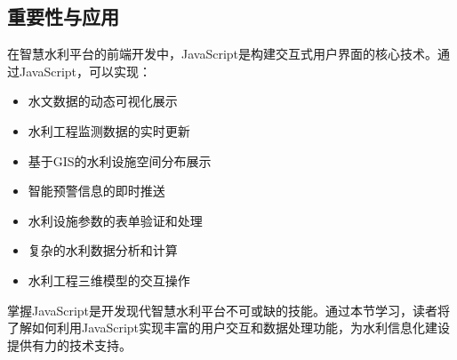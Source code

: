 \subsection{重要性与应用}\label{ux91cdux8981ux6027ux4e0eux5e94ux7528}

在智慧水利平台的前端开发中，JavaScript是构建交互式用户界面的核心技术。通过JavaScript，可以实现：

\begin{itemize}
\tightlist
\item
  水文数据的动态可视化展示
\item
  水利工程监测数据的实时更新
\item
  基于GIS的水利设施空间分布展示
\item
  智能预警信息的即时推送
\item
  水利设施参数的表单验证和处理
\item
  复杂的水利数据分析和计算
\item
  水利工程三维模型的交互操作
\end{itemize}

掌握JavaScript是开发现代智慧水利平台不可或缺的技能。通过本节学习，读者将了解如何利用JavaScript实现丰富的用户交互和数据处理功能，为水利信息化建设提供有力的技术支持。
